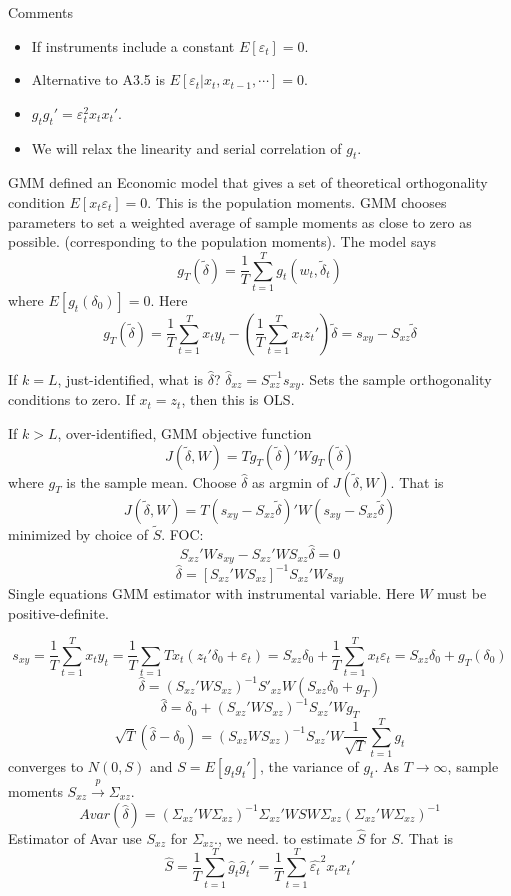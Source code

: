 \documentclass[11pt, a4paper, oneside]{article}
\theoremstyle{definition}
\theoremstyle{proposition}
\theoremstyle{corollary}
\theoremstyle{lemma}
\theoremstyle{theorem}
\begin{document}
Comments
\begin{itemize}
\item If instruments include a constant $E[\varepsilon_t] = 0$. 
\item Alternative to A3.5 is $E[\varepsilon_t|x_{t}, x_{t-1} , \cdots] = 0$.
\item $g_tg_t' = \varepsilon^2_tx_tx_t'$. 
\item We will relax the linearity and serial correlation of $g_t$. 
\end{itemize}

GMM defined an Economic model that gives a set of theoretical orthogonality condition $E[x_t\varepsilon_t] = 0$. This is the population moments. GMM chooses parameters to set a weighted average of sample moments as close to zero as possible. (corresponding to the population moments). The model says 
$$g_T(\tilde{\delta}) = \frac{1}{T}\sum_{t=1}^T g_t(w_t, \tilde{\delta}_t)$$ where $E[g_t(\delta_0)] = 0$. Here $$g_T(\tilde{\delta}) = \frac{1}{T}\sum_{t=1}^Tx_ty_t  - \left(\frac{1}{T}\sum_{t=1}^T x_t z_t'\right)\tilde{\delta} = s_{xy} - S_{xz}\tilde{\delta}$$ 

If $k = L$, just-identified, what is $\hat{\delta}$? $\hat{\delta}_{xz} = S^{-1}_{xz}s_{xy}$. Sets the sample orthogonality conditions to zero. If $x_t = z_t$, then this is OLS. 

If $k > L$, over-identified, GMM objective function 
$$J(\tilde{\delta}, W) = Tg_T(\tilde{\delta})'Wg_T(\tilde{\delta})$$ where $g_T$ is the sample mean. Choose $\hat{\delta}$ as argmin of $J(\tilde{\delta}, W)$. That is 
$$J(\tilde{\delta}, W) = T(s_{xy} - S_{xz} \tilde{\delta})' W(s_{xy}- S_{xz} \tilde{\delta})$$ minimized by choice of $\tilde{S}$. FOC: 
$$S_{xz}'W s_{xy} - S_{xz}'WS_{xz}\hat{\delta} = 0$$
$$\hat{\delta} = \left[S_{xz}' WS_{xz}\right]^{-1}S_{xz}' W s_{xy}$$
Single equations GMM estimator with instrumental variable. Here $W$ must be positive-definite.

 $$s_{xy} = \frac{1}{T} \sum_{t =1}^T x_t y_t = \frac{1}{T}\sum_{t=1}{T} x_t(z_t'\delta_0 + \varepsilon_t) = S_{xz}\delta_0 + \frac{1}{T}\sum_{t=1}^T x_t \varepsilon_t = S_{xz}\delta_0 + g_T(\delta_0)$$
 $$\hat{\delta} = \left(S_{xz}'WS_{xz}\right)^{-1}S'_{xz}W(S_{xz}\delta_0 + g_T)$$
 $$\hat{\delta} = \delta_0 + \left(S_{xz}'WS_{xz}\right)^{-1}S_{xz}'Wg_T$$
 $$\sqrt{T}(\hat{\delta} - \delta_0) = \left(S_{xz}WS_{xz}\right)^{-1}S_{xz}'W\frac{1}{\sqrt{T}}\sum_{t=1}^T g_t$$ 
 converges to $N(0, S)$ and $S = E[g_tg_t']$, the variance of $g_t$. As $T \to \infty$, sample moments $S_{xz} \overset{p}{\to} \Sigma_{xz}$. 
 $$Avar(\hat{\delta}) = \left(\Sigma_{xz}'W\Sigma_{xz}\right)^{-1}\Sigma_{xz}'WSW\Sigma_{xz}\left(\Sigma_{xz}'W\Sigma_{xz}\right)^{-1}$$
Estimator of Avar use $S_{xz}$ for $\Sigma_{xz}$., we need. to estimate $\hat{S}$ for $S$. That is 
$$\hat{S} = \frac{1}{T} \sum_{t=1}^T \hat{g}_t \hat{g}_t' = \frac{1}{T} \sum_{t=1}^T \hat{\varepsilon_t}^2x_t x_t'$$
\end{document}

